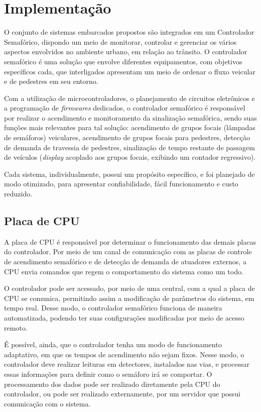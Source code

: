 \chapter{Implementação}

O conjunto de sistemas embarcados propostos são integrados em um Controlador Semafórico, dispondo um meio de monitorar, controlar e gerenciar os vários aspectos envolvidos no ambiente urbano, em relação ao trânsito. O controlador semafórico é uma solução que envolve diferentes equipamentos, com objetivos específicos cada, que interligados apresentam um meio de ordenar o fluxo veicular e de pedestres em seu entorno.

Com a utilização de microcontroladores, o planejamento de circuitos eletrônicos e a programação de \textit{firmwares} dedicados, o controlador semafórico é responsável por realizar o acendimento e monitoramento da sinalização semafórica, sendo suas funções mais relevantes para tal solução: acendimento de grupos focais (lâmpadas de semáforos) veiculares, acendimento de grupos focais para pedestres, detecção de demanda de travessia de pedestres, sinalização de tempo restante de passagem de veículos (\textit{display} acoplado aos grupos focais, exibindo um contador regressivo).

Cada sistema, individualmente, possui um propósito específico, e foi planejado de modo otimizado, para apresentar confiabilidade, fácil funcionamento e custo reduzido.


\section{Placa de CPU}

A placa de CPU é responsável por determinar o funcionamento das demais placas do controlador. Por meio de um canal de comunicação com as placas de controle de acendimento semafórico e de detecção de demanda de atuadores externos, a CPU envia comandos que regem o comportamento do sistema como um todo.

O controlador pode ser acessado, por meio de uma central, com a qual a placa de CPU se comunica, permitindo assim a modificação de parâmetros do sistema, em tempo real. Desse modo, o controlador semafórico funciona de maneira automatizada, podendo ter suas configurações modificadas por meio de acesso remoto.

É possível, ainda, que o controlador tenha um modo de funcionamento adaptativo, em que os tempos de acendimento não sejam fixos. Nesse modo, o controlador deve realizar leituras em detectores, instalados nas vias, e processar essas informações para definir como o semáforo irá se comportar.
O processamento dos dados pode ser realizado diretamente pela CPU do controlador, ou pode ser realizado externamente, por um servidor que possui comunicação com o sistema.

